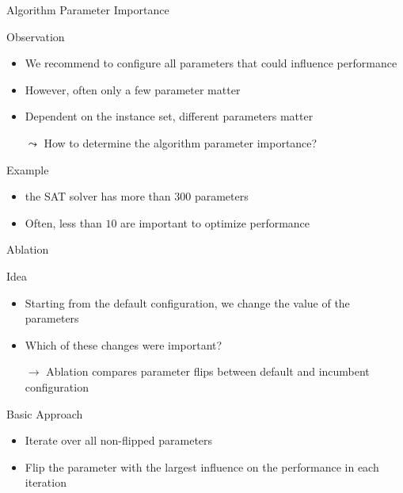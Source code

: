 \begin{frame}[c]{Algorithm Parameter Importance}

\begin{block}{Observation}
\begin{itemize}
  \item We recommend to configure all parameters that could influence performance
  \pause
  \item However, often only a few parameter matter
  \pause 
  \item Dependent on the instance set, different parameters matter 
  \pause
  \item[$\leadsto$] \alert{How to determine the algorithm parameter importance}?
\end{itemize}
\end{block}

\medskip
\pause

\begin{block}{Example}
\begin{itemize}
  \item the SAT solver \lingeling{} has more than $300$ parameters
  \item Often, less than $10$ are important to optimize performance
\end{itemize}
\end{block}


\end{frame}
\begin{frame}[c]{Ablation~}

\small
\begin{block}{Idea}
\begin{itemize}
  \item Starting from the default configuration, we change the value of the parameters
  \item Which of these changes were important?
  \item[$\to$] Ablation compares parameter flips between default and incumbent configuration  
\end{itemize}
\end{block}

\pause

\begin{block}{Basic Approach}
\begin{itemize}
  \item Iterate over all non-flipped parameters
  \item Flip the parameter with the largest influence on the performance in each iteration
\end{itemize}
\end{block}
 
\end{frame}
